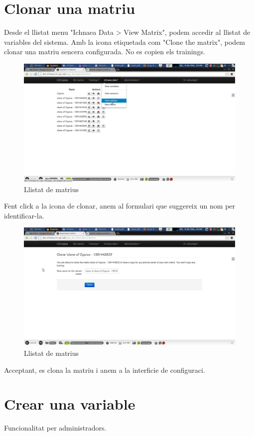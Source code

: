 \section{Clonar una matriu}
Desde el llistat menu "Ichnaea Data > View Matrix", podem accedir al llistat de variables del sistema. Amb la icona etiquetada com "Clone the matrix", podem clonar una matriu sencera configurada. No es copien els trainings.
\begin{figure}[h!]
  \centering
  \includegraphics[scale=0.2]{img/userguide/clone_matrix.png}
  \caption{Llistat de matrius}
  \label{fig:placement}
\end{figure}
Fent click a la icona de clonar, anem al formulari que suggereix un nom per identificar-la.
\begin{figure}[h!]
  \centering
  \includegraphics[scale=0.2]{img/userguide/clone_matrix-2.png}
  \caption{Llistat de matrius}
  \label{fig:placement}
\end{figure}
Acceptant, es clona la matriu i anem a la interficie de configuraci.


\section{Crear una variable}
Funcionalitat per administradors.

